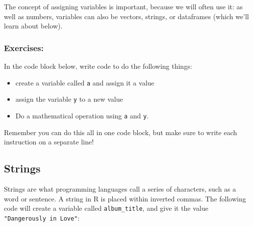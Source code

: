 \documentclass[
  letterpaper,
  DIV=11,
  numbers=noendperiod]{scrreprt}
\newenvironment{Shaded}{\begin{snugshade}}{\end{snugshade}}
\begin{document}
The concept of assigning variables is important, because we will often
use it: as well as numbers, variables can also be vectors, strings, or
dataframes (which we'll learn about below).

\subsubsection{Exercises:}\label{exercises}

In the code block below, write code to do the following things:

\begin{itemize}
\item
  create a variable called \texttt{a} and assign it a value
\item
  assign the variable \texttt{y} to a new value
\item
  Do a mathematical operation using \texttt{a} and \texttt{y}.
\end{itemize}

\begin{Shaded}
\begin{Highlighting}[]

\end{Highlighting}
\end{Shaded}

\begin{tcolorbox}[enhanced jigsaw, coltitle=black, bottomrule=.15mm, title=\textcolor{quarto-callout-tip-color}{\faLightbulb}\hspace{0.5em}{Tip}, leftrule=.75mm, colframe=quarto-callout-tip-color-frame, breakable, toprule=.15mm, opacityback=0, bottomtitle=1mm, toptitle=1mm, colback=white, rightrule=.15mm, titlerule=0mm, left=2mm, arc=.35mm, opacitybacktitle=0.6, colbacktitle=quarto-callout-tip-color!10!white]

Remember you can do this all in one code block, but make sure to write
each instruction on a separate line!

\end{tcolorbox}

\subsection{Strings}\label{strings}

Strings are what programming languages call a series of characters, such
as a word or sentence. A string in R is placed within inverted commas.
The following code will create a variable called \texttt{album\_title},
and give it the value \texttt{"Dangerously\ in\ Love"}:
\end{document}
